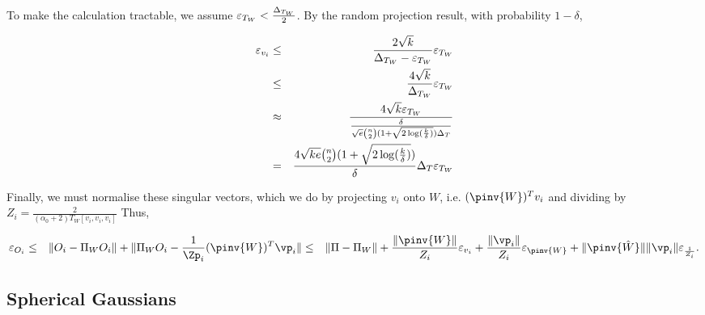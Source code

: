 To make the calculation tractable, we assume $\varepsilon_{T_W}
< \frac{\Delta_{T_W}}{2}$. By the random projection result, with probability $1-\delta$,  

\begin{eqnarray}
  \varepsilon_{v_i} 
    &\le& \frac{2 \sqrt{k}}{\Delta_{T_W} - \varepsilon_{T_W}}  \varepsilon_{T_W}\\
    &\le& \frac{4 \sqrt{k}}{\Delta_{T_W}}  \varepsilon_{T_W}\\
    &\approx& \frac{4 \sqrt{k} \varepsilon_{T_W}}{\frac{\delta}{\sqrt{e} \binom{n}{2} (1 + \sqrt{2\log(\frac{k}{\delta})}) \Delta_{T}}} \\
    &=& \frac{4 \sqrt{ke} \binom{n}{2} (1 + \sqrt{2\log(\frac{k}{\delta})})}{\delta} \Delta_{T} \varepsilon_{T_W}
\end{eqnarray}


Finally, we must normalise these singular vectors, which we do by
projecting $v_i$ onto $W$, i.e. $(\pinv{W})^T v_i$ and dividing by $Z_i
= \frac{2}{(\alpha_0 + 2) T_W[v_i, v_i, v_i]}$ Thus, 

\begin{eqnarray}
  \aerr{O_i} 
  &\le& \| O_i - \Pi_W O_i \| + \| \Pi_W O_i - \frac{1}{\Zp_i} (\pinv{W})^T \vp_i \|
  &\le& \|\Pi - \Pi_W\| 
  + \frac{\|\pinv{W}\|}{Z_i} \aerr{v_i} 
  + \frac{\|\vp_i\|}{Z_i} \aerr{\pinv{W}} 
  + \|\pinv{\Wp}\| \|\vp_i\| \aerr{\frac{1}{Z_i}}.
\end{eqnarray}

\subsection{Spherical Gaussians}

